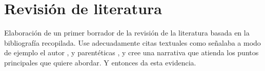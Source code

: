 \documentclass[11pt]{article}
\begin{document}
\section*{Revisión de literatura}
Elaboración de un primer borrador de la revisión de la literatura basada en la bibliografía recopilada. Use adecuadamente citas textuales como señalaba a modo de ejemplo el autor \citet{hall2001introduction}, y parentéticas \citep[e.g.,][, entre otros]{hall2009institutional}, y cree una narrativa que atienda los puntos principales que quiere abordar. Y entonces \citet{figueroa2025captado} da esta evidencia.

\printbibliography[title={Bibliografía}, heading=subbibliography]
\end{document}
